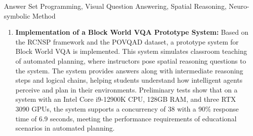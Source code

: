 \begin{englishabstract}{Answer Set Programming, Visual Question Answering, Spatial Reasoning, Neuro-symbolic Method}
\begin{enumerate}[nosep]
\item \textbf{Implementation of a Block World VQA Prototype System:}  
Based on the RCNSP framework and the POVQAD dataset, a prototype system for Block World VQA is implemented. This system simulates classroom teaching of automated planning, where instructors pose spatial reasoning questions to the system. The system provides answers along with intermediate reasoning steps and logical chains, helping students understand how intelligent agents perceive and plan in their environments. Preliminary tests show that on a system with an Intel Core i9-12900K CPU, 128GB RAM, and three RTX 3090 GPUs, the system supports a concurrency of 38 with a 90\% response time of 6.9 seconds, meeting the performance requirements of educational scenarios in automated planning.
\end{enumerate}
\end{englishabstract}

\tableofcontents
\listofothers
